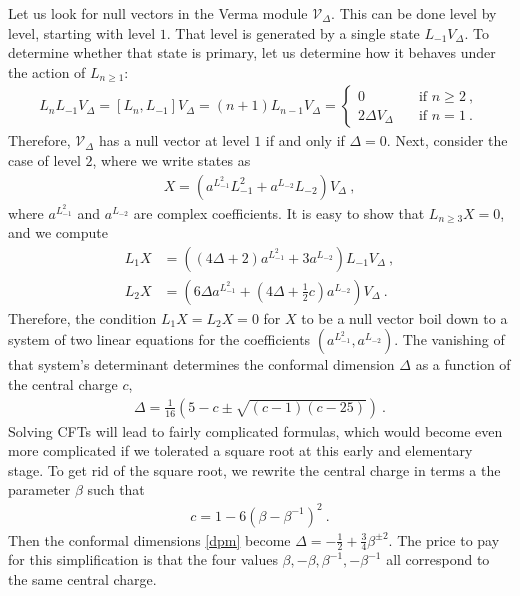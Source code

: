 \documentclass[12pt, a4paper]{article}
\theoremstyle{break}
\begin{document}
Let us look for null vectors in the Verma module $\mathcal{V}_\Delta$. This can be done level by level, starting with level $1$. That level is generated by a single state $L_{-1}V_\Delta$. To determine whether that state is primary, let us determine how it behaves under the action of $L_{n\geq 1}$:
\begin{align}
L_n L_{-1}V_\Delta = [L_n, L_{-1}] V_\Delta = (n+1) L_{n-1}V_\Delta = 
\left\{\begin{array}{ll} 0 &  \quad \text{if } n\geq 2\ , \\ 2\Delta V_\Delta & \quad \text{if } n = 1\ . \end{array}\right. 
\end{align}
Therefore, $\mathcal{V}_\Delta$ has a null vector at level $1$ if and only if $\Delta=0$. Next, consider the case of level $2$, where we write states as 
\begin{align}
 X{} = \left(a^{L_{-1}^2} L_{-1}^2 + a^{L_{-2}} L_{-2}\right) V_\Delta\ ,
\end{align}
where $a^{L_{-1}^2}$ and $a^{L_{-2}}$ are complex coefficients. It is easy to show that $L_{n\geq 3}X{}=0$, and we compute 
\begin{align}
 L_1X{} &= \left((4\Delta+2)a^{L_{-1}^2} + 3a^{L_{-2}}\right) L_{-1}V_\Delta\ ,
 \label{l1c}
\\
L_2 X{} &= \left(6\Delta a^{L_{-1}^2}+(4\Delta+\tfrac12 c) a^{L_{-2}}\right)V_\Delta\ .
\label{l2c}
\end{align}
Therefore, the condition $L_1X{}=L_2 X{}=0$ for $X{}$ to be a null vector boil down to a system of two linear equations for the coefficients $(a^{L_{-1}^2},a^{L_{-2}})$. The vanishing of that system's determinant determines the conformal dimension $\Delta$ as a function of the central charge $c$,
\begin{align}
 \Delta = \frac{1}{16}\left( 5-c\pm\sqrt{(c-1)(c-25)} \right) \ .
 \label{dpm}
\end{align}
Solving CFTs will lead to fairly complicated formulas, which would become even more complicated if we tolerated a square root at this early and elementary stage.
To get rid of the square root, we rewrite the central charge in terms a the parameter $\beta$ such that 
\begin{align}
 \boxed{c = 1- 6\left(\beta - \beta^{-1}\right)^2 } \ .
 \label{cb}
\end{align}
Then the conformal dimensions \eqref{dpm} become 
$
 \Delta = -\frac12 + \frac34\beta^{\pm 2}
$. The price to pay for this simplification is that the four values $\beta,-\beta,\beta^{-1},-\beta^{-1}$ all correspond to the same central charge. 
\end{document}
